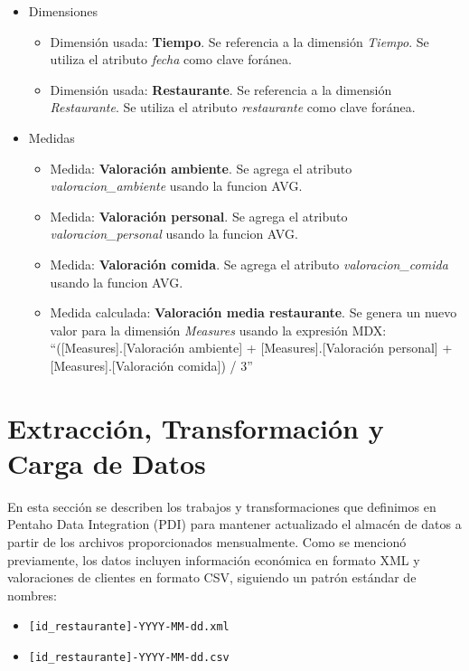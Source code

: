 \documentclass[11pt]{opticajnl}
\begin{document}
\begin{itemize}
\begin{itemize}
\item Dimensiones
\begin{itemize}
\item Dimensión usada: \textbf{Tiempo}. Se referencia a la dimensión \textit{Tiempo}. Se utiliza el atributo \textit{fecha} como clave foránea.
\item Dimensión usada: \textbf{Restaurante}. Se referencia a la dimensión \textit{Restaurante}. Se utiliza el atributo \textit{restaurante} como clave foránea.
\end{itemize}
\item Medidas
\begin{itemize}
\item Medida: \textbf{Valoración ambiente}. Se agrega el atributo \textit{valoracion\_ambiente} usando la funcion AVG.
\item Medida: \textbf{Valoración personal}. Se agrega el atributo \textit{valoracion\_personal} usando la funcion AVG.
\item Medida: \textbf{Valoración comida}. Se agrega el atributo \textit{valoracion\_comida} usando la funcion AVG.
\item Medida calculada: \textbf{Valoración media restaurante}. Se genera un nuevo valor para la dimensión \textit{Measures} usando la expresión MDX: ``([Measures].[Valoración ambiente] + [Measures].[Valoración personal] + [Measures].[Valoración comida]) / 3''
\end{itemize}
\end{itemize}
\end{itemize}







\section{Extracción, Transformación y Carga de Datos}

En esta sección se describen los trabajos y transformaciones que definimos en Pentaho Data Integration (PDI) para mantener actualizado el almacén de datos a partir de los archivos proporcionados mensualmente. Como se mencionó previamente, los datos incluyen información económica en formato XML y valoraciones de clientes en formato CSV, siguiendo un patrón estándar de nombres:

\begin{itemize}
    \item \texttt{[id\_restaurante]-YYYY-MM-dd.xml}
    \item \texttt{[id\_restaurante]-YYYY-MM-dd.csv}
\end{itemize}
\end{document}
